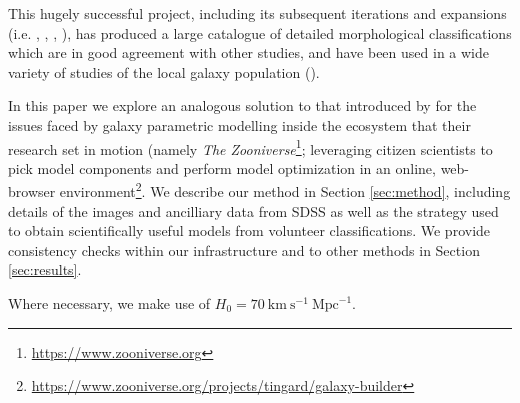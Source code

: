 \documentclass[../main.tex]{subfiles}
\begin{document}
This hugely successful project, including its subsequent iterations and expansions (i.e. \citealt{Willett2013:1308.3496v2}, \citealt{2017MNRAS.464.4176W}, \citealt{2017MNRAS.464.4420S}, \citealt{Hart2016:1607.01019v1}), has produced a large catalogue of detailed morphological classifications which are in good agreement with other studies, and have been used in a wide variety of studies of the local galaxy population ().

In this paper we explore an analogous solution to that introduced by \citet{Lintott2008:0804.4483v1} for the issues faced by galaxy parametric modelling inside the ecosystem that their research set in motion (namely {\it The Zooniverse}\footnote{\url{https://www.zooniverse.org}}; leveraging citizen scientists to pick model components and perform model optimization in an online, web-browser environment\footnote{\url{https://www.zooniverse.org/projects/tingard/galaxy-builder}}. We describe our method in Section \ref{sec:method}, including details of the images and ancilliary data from SDSS as well as the strategy used to obtain scientifically useful models from volunteer classifications. We provide consistency checks within our infrastructure and to other methods in Section \ref{sec:results}.

Where necessary, we make use of $H_0 = 70\ \text{km}\ \text{s}^{-1}\ \text{Mpc}^{-1}$.
\end{document}
